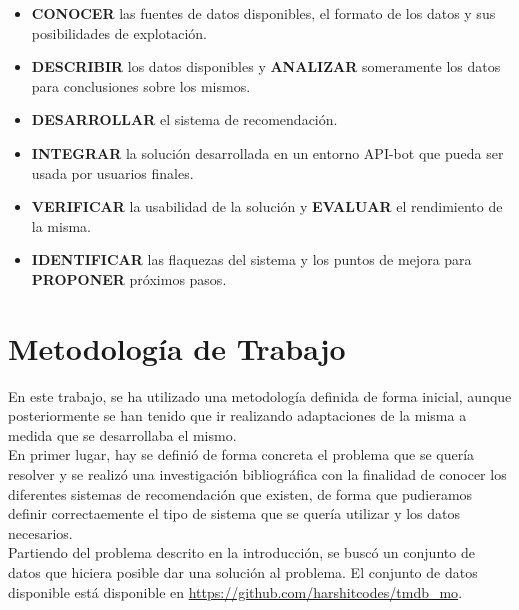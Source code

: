 \begin{itemize}
    \item \textbf{CONOCER} las fuentes de datos disponibles, el formato de los datos y sus posibilidades de explotación.
    \item \textbf{DESCRIBIR} los datos disponibles y \textbf{ANALIZAR} someramente los datos para conclusiones sobre los mismos.
    \item \textbf{DESARROLLAR} el sistema de recomendación.
    \item \textbf{INTEGRAR} la solución desarrollada en un entorno API-bot que pueda ser usada por usuarios finales.
    \item \textbf{VERIFICAR} la usabilidad de la solución y \textbf{EVALUAR} el rendimiento de la misma.
    \item \textbf{IDENTIFICAR} las flaquezas del sistema y los puntos de mejora para \textbf{PROPONER} próximos pasos.
\end{itemize}

\section{Metodología de Trabajo}\label{sec:metodología}

En este trabajo, se ha utilizado una metodología definida de forma inicial, aunque posteriormente se han tenido que ir realizando adaptaciones de la misma a medida que se desarrollaba el mismo.\\

En primer lugar, hay se definió de forma concreta el problema que se quería resolver y se realizó una investigación bibliográfica con la finalidad de conocer los diferentes sistemas de recomendación que existen, de forma que pudieramos definir correctaemente el tipo de sistema que se quería utilizar y los datos necesarios.\\

Partiendo del problema descrito en la introducción, se buscó un conjunto de datos que hiciera posible dar una solución al problema. El conjunto de datos disponible está disponible en \url{https://github.com/harshitcodes/tmdb_mo}.\\

